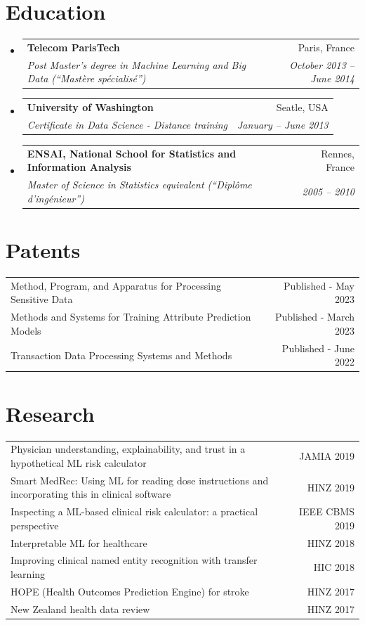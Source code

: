 \documentclass[letterpaper,11pt]{article}
\makeatletter
\newcommand{\resumeSubheading}[4]{
  \vspace{-1pt}\item
    \begin{tabular*}{0.97\textwidth}[t]{l@{\extracolsep{\fill}}r}
      \textbf{#1} & #2 \\
      \textit{\small#3} & \textit{\small #4} \\
    \end{tabular*}\vspace{-5pt}
}
\newcommand{\resumeSubHeadingListStart}{\begin{itemize}[leftmargin=*]}
\newcommand{\resumeSubHeadingListEnd}{\end{itemize}}
\makeatother
\begin{document}
\section{Education}
  \resumeSubHeadingListStart
    \resumeSubheading
      {Telecom ParisTech}{Paris, France}
      {Post Master’s degree in Machine Learning and Big Data (“Mastère spécialisé”)}{October 2013 -- June 2014}
    \resumeSubheading
      {University of Washington}{Seatle, USA}
      {Certificate in Data Science - Distance training}{January -- June 2013}
    \resumeSubheading
      {ENSAI, National School for Statistics and Information Analysis}{Rennes, France}
      {Master of Science in Statistics equivalent (“Diplôme d’ingénieur”)}{2005 -- 2010}
  \resumeSubHeadingListEnd
  
\section{Patents}
\begin{tabular*}{\textwidth}{l@{\extracolsep{\fill}}r}
Method, Program, and Apparatus for Processing Sensitive Data & Published - May 2023\\
Methods and Systems for Training Attribute Prediction Models & Published - March 2023\\
Transaction Data Processing Systems and Methods & Published - June 2022\\
\end{tabular*}

\section{Research} 
\begin{tabular*}{\textwidth}{l@{\extracolsep{\fill}}r}
Physician understanding, explainability, and trust in a hypothetical ML risk calculator & JAMIA 2019\\
{\small Smart MedRec: Using ML for reading dose instructions and incorporating this in clinical software} & HINZ 2019\\
Inspecting a ML-based clinical risk calculator: a practical perspective & IEEE CBMS 2019\\
Interpretable ML for healthcare & HINZ 2018\\
Improving clinical named entity recognition with transfer learning &  HIC 2018\\
HOPE (Health Outcomes Prediction Engine) for stroke & HINZ 2017\\
New Zealand health data review & HINZ 2017\\
\end{tabular*}
\end{document}
